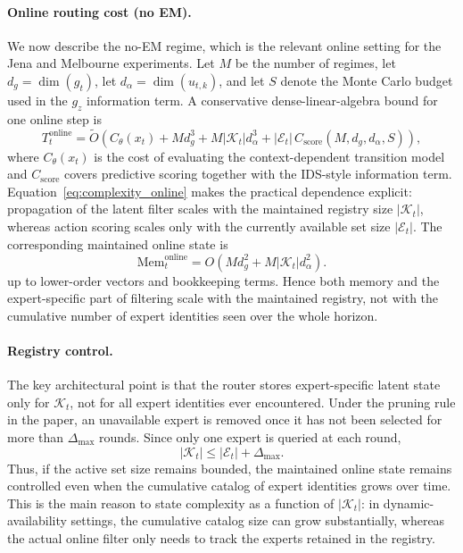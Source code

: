 \paragraph{Online routing cost (no EM).}
We now describe the no-EM regime, which is the relevant online setting for the Jena and Melbourne experiments. Let \(M\) be the number of regimes, let \(d_g = \dim(g_t)\), let \(d_\alpha = \dim(u_{t,k})\), and let \(S\) denote the Monte Carlo budget used in the \(g_z\) information term. A conservative dense-linear-algebra bound for one online step is
\begin{equation}
T_t^{\mathrm{online}}
=
\widetilde O\!\left(
C_\theta(x_t)
+
M d_g^3
+
M |\mathcal K_t| d_\alpha^3
+
|\mathcal E_t|\, C_{\mathrm{score}}(M,d_g,d_\alpha,S)
\right),
\label{eq:complexity_online}
\end{equation}
where \(C_\theta(x_t)\) is the cost of evaluating the context-dependent transition model and \(C_{\mathrm{score}}\) covers predictive scoring together with the IDS-style information term. Equation~\eqref{eq:complexity_online} makes the practical dependence explicit: propagation of the latent filter scales with the maintained registry size \(|\mathcal K_t|\), whereas action scoring scales only with the currently available set size \(|\mathcal E_t|\). The corresponding maintained online state is
\begin{equation}
\mathrm{Mem}_t^{\mathrm{online}}
=
O\!\left(
M d_g^2 + M |\mathcal K_t| d_\alpha^2
\right).
\label{eq:complexity_memory}
\end{equation}
up to lower-order vectors and bookkeeping terms. Hence both memory and the expert-specific part of filtering scale with the maintained registry, not with the cumulative number of expert identities seen over the whole horizon.

\paragraph{Registry control.}
The key architectural point is that the router stores expert-specific latent state only for \(\mathcal K_t\), not for all expert identities ever encountered. Under the pruning rule in the paper, an unavailable expert is removed once it has not been selected for more than \(\Delta_{\max}\) rounds. Since only one expert is queried at each round,
\begin{equation}
|\mathcal K_t|
\le
|\mathcal E_t|+\Delta_{\max}.
\label{eq:complexity_registry_bound}
\end{equation}
Thus, if the active set size remains bounded, the maintained online state remains controlled even when the cumulative catalog of expert identities grows over time. This is the main reason to state complexity as a function of \(|\mathcal K_t|\): in dynamic-availability settings, the cumulative catalog size can grow substantially, whereas the actual online filter only needs to track the experts retained in the registry.

